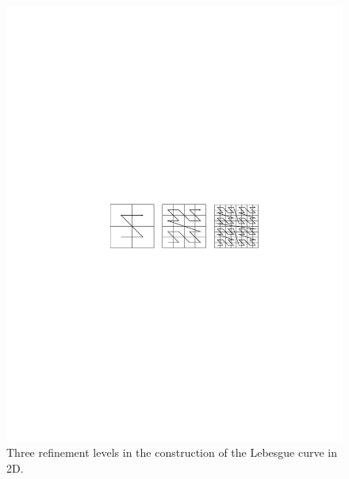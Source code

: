 \begin{figure}[ht]
    \centering
    \includegraphics[scale=1.0, viewport = 150 350 500 435, clip]{figures/lebesgue.pdf}
    \caption{\footnotesize{Three refinement levels in the construction of the Lebesgue 
	curve in 2D.}}
    \label{fig:lebesgue}
\end{figure}
